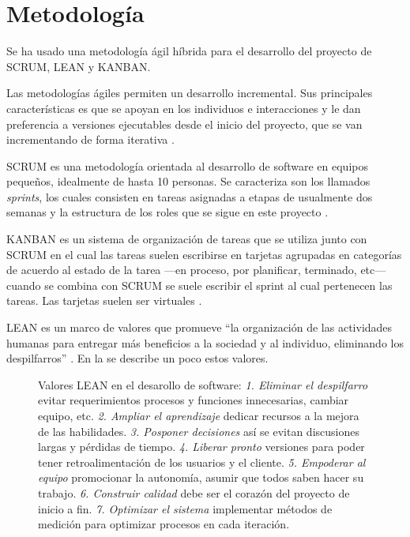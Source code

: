 \section{Metodología}

Se ha usado una metodología ágil híbrida para el desarrollo del proyecto de SCRUM, LEAN y KANBAN.  

Las metodologías ágiles permiten un desarrollo incremental. Sus principales
características es que se apoyan en los individuos e interacciones y le dan preferencia a versiones ejecutables desde el inicio del proyecto, que se van incrementando de forma iterativa \parencite{pmi2017}. 

SCRUM es una metodología orientada al desarrollo de software en equipos pequeños, idealmente de hasta 10 personas. Se caracteriza son los llamados \textit{sprints}, los cuales consisten en tareas asignadas a etapas de usualmente dos semanas y la estructura de los roles que se sigue en este proyecto \parencite{schwaber2020}.

KANBAN es un sistema de organización de tareas que se utiliza junto con SCRUM en el cual las tareas suelen escribirse en tarjetas agrupadas en categorías de acuerdo al estado de la tarea —en proceso, por planificar, terminado, etc— cuando se combina con SCRUM se suele escribir el sprint al cual pertenecen las tareas. Las tarjetas suelen ser virtuales \parencite{stellman2014}. 

LEAN es un marco de valores que promueve ``la organización de las actividades humanas para entregar más beneficios a la sociedad y al individuo, eliminando los despilfarros'' \parencite{womack2003}. En la  se describe un poco estos valores.

\begin{figure}
    \centering
    \caption[Pensamiento LEAN]{Valores LEAN en el desarollo de software: \textit{1. Eliminar el despilfarro} evitar requerimientos procesos y funciones innecesarias, cambiar equipo, etc. \textit{2. Ampliar el aprendizaje} dedicar recursos a la mejora de las habilidades. \textit{3. Posponer decisiones} así se evitan discusiones largas y pérdidas de tiempo. \textit{4. Liberar pronto} versiones para poder tener retroalimentación de los usuarios y el cliente. \textit{5. Empoderar al equipo} promocionar la autonomía, asumir que todos saben hacer su trabajo. \textit{6. Construir calidad} debe ser el corazón del proyecto de inicio a fin. \textit{7. Optimizar el sistema} implementar métodos de medición para optimizar procesos en cada iteración.}
    \label{fig:penasmientolean}
    
  \end{figure}
  

